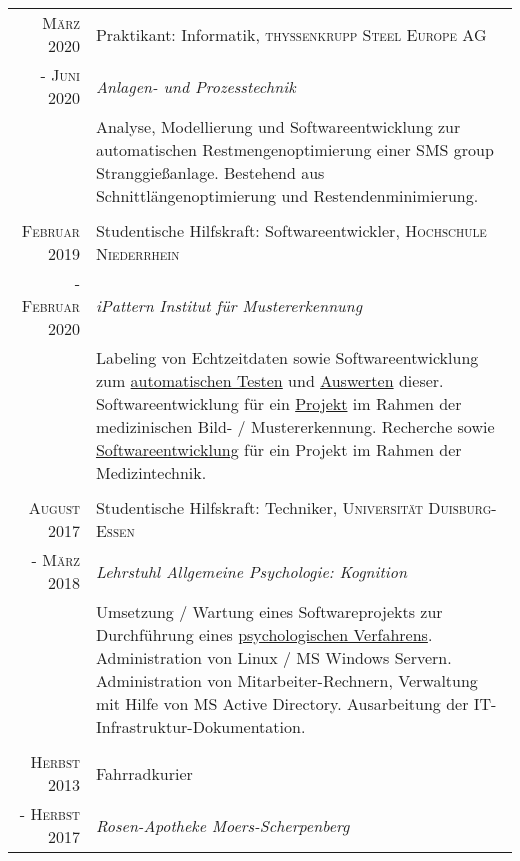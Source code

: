 \documentclass[10pt,a4paper]{article}
\begin{document}
\begin{tabular}{r|p{11cm}}
	\textsc{M\"arz} 2020 & Praktikant: Informatik, \textsc{thyssenkrupp Steel Europe AG} \\
	- \textsc{Juni} 2020 & \emph{Anlagen- und Prozesstechnik} \\
	& \footnotesize{Analyse, Modellierung und Softwareentwicklung zur automatischen Restmengenoptimierung einer SMS group Stranggie\ss anlage. Bestehend aus Schnittl\"angenoptimierung und Restendenminimierung.} \\
	\multicolumn{2}{c}{} \\

 	\textsc{Februar} 2019	& Studentische Hilfskraft: Softwareentwickler, \textsc{Hochschule Niederrhein} \\
	- \textsc{Februar} 2020	& \emph{iPattern Institut f\"ur Mustererkennung} \\
	& \footnotesize{Labeling von Echtzeitdaten sowie Softwareentwicklung zum \href{https://github.com/thahnen/labelbox-export-minifier}{automatischen Testen} und \href{https://github.com/thahnen/labelbox-scripts-etc}{Auswerten} dieser. Softwareentwicklung f\"ur ein \href{https://www.hs-niederrhein.de/ipattern/nachrichten-detailseite/?tx_news_pi1\%5Bnews\%5D=9545\&cHash=3202e26ca1ce23d3b3231df1f5c5a573}{Projekt} im Rahmen der medizinischen Bild- / Mustererkennung. Recherche sowie \href{https://github.com/thahnen/elastix-scripts-etc}{Softwareentwicklung} f\"ur ein Projekt im Rahmen der Medizintechnik.} \\
	\multicolumn{2}{c}{} \\
	
	 \textsc{August} 2017	& Studentische Hilfskraft: Techniker, \textsc{Universit\"at Duisburg-Essen} \\
	 - \textsc{M\"arz} 2018	& \emph{Lehrstuhl Allgemeine Psychologie: Kognition} \\
	 & \footnotesize{Umsetzung / Wartung eines Softwareprojekts zur Durchf\"uhrung eines \href{https://gdt.allgpsy.uni-due.de}{psychologischen Verfahrens}. Administration von Linux / MS Windows Servern. Administration von Mitarbeiter-Rechnern, Verwaltung mit Hilfe von MS Active Directory. Ausarbeitung der IT-Infrastruktur-Dokumentation.} \\
	 \multicolumn{2}{c}{} \\
	 
	\textsc{Herbst} 2013		& Fahrradkurier \\
	- \textsc{Herbst} 2017	& \emph{Rosen-Apotheke Moers-Scherpenberg}
\end{tabular} \\
\end{document}

